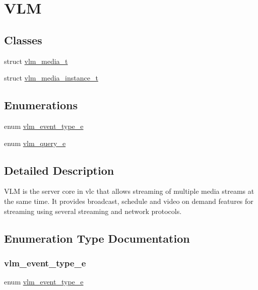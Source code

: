 \hypertarget{group__server}{}\section{V\+LM}
\label{group__server}
\subsection*{Classes}
\begin{DoxyCompactItemize}
\item 
struct \hyperlink{structvlm__media__t}{vlm\+\_\+media\+\_\+t}
\item 
struct \hyperlink{structvlm__media__instance__t}{vlm\+\_\+media\+\_\+instance\+\_\+t}
\end{DoxyCompactItemize}
\subsection*{Enumerations}
\begin{DoxyCompactItemize}
\item 
enum \hyperlink{group__server_gae0b625cfc0da775854684b1acd329d66}{vlm\+\_\+event\+\_\+type\+\_\+e} 
\item 
enum \hyperlink{group__server_gab547769cc956818fbebbe18a14ac0d98}{vlm\+\_\+query\+\_\+e} 
\end{DoxyCompactItemize}


\subsection{Detailed Description}
V\+LM is the server core in vlc that allows streaming of multiple media streams at the same time. It provides broadcast, schedule and video on demand features for streaming using several streaming and network protocols. 

\subsection{Enumeration Type Documentation}
\mbox{\label{group__server_gae0b625cfc0da775854684b1acd329d66}} 
\subsubsection{\texorpdfstring{vlm\+\_\+event\+\_\+type\+\_\+e}{vlm\_event\_type\_e}}
{\footnotesize\ttfamily enum \hyperlink{group__server_gae0b625cfc0da775854684b1acd329d66}{vlm\+\_\+event\+\_\+type\+\_\+e}}

